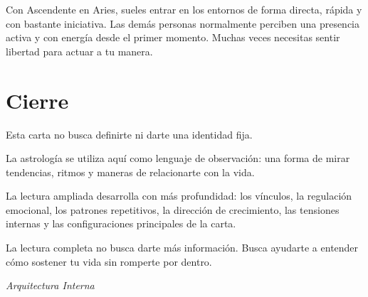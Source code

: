 \documentclass[11pt,a4paper]{article}
\begin{document}
Con Ascendente en Aries, sueles entrar en los entornos de forma directa, rápida y con bastante iniciativa. Las demás personas normalmente perciben una presencia activa y con energía desde el primer momento. Muchas veces necesitas sentir libertad para actuar a tu manera.

\vspace{0.8cm}


\section{Cierre}

Esta carta no busca definirte ni darte una identidad fija.

La astrología se utiliza aquí como lenguaje de observación:
una forma de mirar tendencias, ritmos y maneras de relacionarte con la vida.

La lectura ampliada desarrolla con más profundidad:
los vínculos,
la regulación emocional,
los patrones repetitivos,
la dirección de crecimiento,
las tensiones internas
y las configuraciones principales de la carta.

La lectura completa no busca darte más información.
Busca ayudarte a entender cómo sostener tu vida sin romperte por dentro.

\vspace{1cm}

\begin{center}

{\small\itshape\color{grisai}
Arquitectura Interna
}

\end{center}
\end{document}

